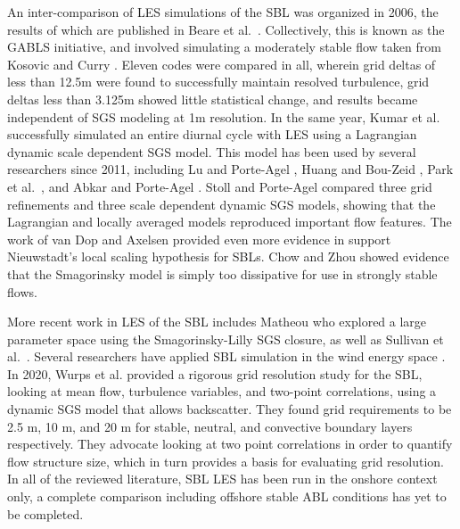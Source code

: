 \documentclass[conf]{new-aiaa}
\begin{document}
An inter-comparison of LES simulations of the SBL was organized in 2006, the
results of which are published in Beare et al.\ \cite{Beare2006}. Collectively,
this is known as the GABLS initiative, and involved simulating a moderately
stable flow taken from Kosovic and Curry \cite{Kosovic2000}. Eleven codes
were compared in all, wherein grid deltas of less than 12.5m were found to
successfully maintain resolved turbulence, grid deltas less than 3.125m
showed little statistical change, and results became independent of SGS
modeling at 1m resolution. In the same year, Kumar et al. \cite{Kumar2006}
successfully simulated an entire diurnal cycle with LES using a Lagrangian
dynamic scale dependent SGS model. This model has been used by several
researchers since 2011, including Lu and Porte-Agel \cite{Lu2011}, Huang
and Bou-Zeid \cite{Huang2013}, Park et al.\ \cite{Park2014}, and
Abkar and Porte-Agel \cite{Abkar2015}. Stoll and Porte-Agel \cite{Stoll2007}
compared three grid refinements and three scale dependent dynamic SGS models,
showing that the Lagrangian and locally averaged models reproduced important
flow features. The work of van Dop and Axelsen \cite{vanDop2007} provided
even more evidence in support Nieuwstadt's local scaling hypothesis for SBLs.
Chow and Zhou \cite{Chow2011} showed evidence that the Smagorinsky model is
simply too dissipative for use in strongly stable flows.

More recent work in LES of the SBL includes Matheou \cite{Matheou2016} who
explored a large parameter space using the Smagorinsky-Lilly SGS
closure, as well as Sullivan et al.\ \cite{sullivan2016turbulent}. Several researchers
have applied SBL simulation in the wind energy space \cite{Aitken2014, Abkar2015, Ghaisas2017}.
In 2020, Wurps et al. \cite{Wurps2020} provided a rigorous grid resolution study for the SBL,
looking at mean flow, turbulence variables, and two-point correlations, using a dynamic
SGS model that allows backscatter. They found grid requirements to be 2.5 m, 10 m, and 20 m
for stable, neutral, and convective boundary layers respectively. They advocate looking
at two point correlations in order to quantify flow structure size, which in turn
provides a basis for evaluating grid resolution. In all of the reviewed literature, SBL LES
has been run in the onshore context only, a complete comparison
including offshore stable ABL conditions has yet to be completed.
\end{document}
